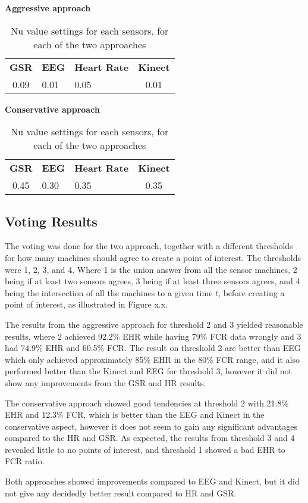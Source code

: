 \begin{table}[h]
  \centering
  \textbf{Aggressive approach}\vspace{2pt}
  \begin{tabularx}{\columnwidth}{cXXc}
    \toprule
    \textbf{GSR} & \textbf{EEG} & \textbf{Heart Rate} & \textbf{Kinect} \\
    0.09 & 0.01 & 0.05 & 0.01 \\
    \bottomrule
  \end{tabularx}

  \textbf{Conservative approach}\vspace{2pt}
  \begin{tabularx}{\columnwidth}{cXXc}
    \toprule
    \textbf{GSR} & \textbf{EEG} & \textbf{Heart Rate} & \textbf{Kinect} \\
    0.45 & 0.30 & 0.35 & 0.35 \\
    \bottomrule
  \end{tabularx}
  \caption{Nu value settings for each sensors, for each of the two approaches}
  \label{tab:nu_voting_settings}
\end{table}


\subsection{Voting Results}

The voting was done for the two approach, together with a different thresholds for how many machines should agree to create a point of interest.
The thresholds were 1, 2, 3, and 4. Where 1 is the union answer from all the sensor machines, 2 being if at least two sensors agrees, 3 being if at least three sensors agrees, and 4 being the intersection of all the machines to a given time $t$, before creating a point of interest, as illustrated in Figure x.x.

The results from the aggressive approach for threshold 2 and 3 yielded reasonable results, where 2 achieved 92.2\% EHR while having 79\% FCR data wrongly and 3 had 74.9\% EHR and 60.5\% FCR.
The result on threshold 2 are better than EEG which only achieved approximately 85\% EHR in the 80\% FCR range, and it also performed better than the Kinect and EEG for threshold 3, however it did not show any improvements from the GSR and HR results.



The conservative approach showed good tendencies at threshold 2 with 21.8\% EHR and 12.3\% FCR, which is better than the EEG and Kinect in the conservative aspect, however it does not seem to gain any significant advantages compared to the HR and GSR.
As expected, the results from threshold 3 and 4 revealed little to no points of interest, and threshold 1 showed a bad EHR to FCR ratio. 

Both approaches showed improvements compared to EEG and Kinect, but it did not give any decidedly better result compared
to HR and GSR.

